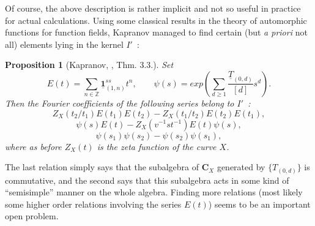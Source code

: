 \documentclass[a4paper,10pt]{amsart}
\def\Z{\mathbb{Z}}
\def\CC{\mathbf{C}}
\newtheorem{prop}[theo]{Proposition}
\numberwithin{equation}{section}
\begin{document}
{\vspace{.15in}

Of course, the above description is rather implicit and not so useful in practice for actual calculations. Using some classical results in the theory of automorphic functions for function fields, Kapranov managed to find certain (but \textit{a priori} not all) elements lying in the kernel $I'$~:

\vspace{.1in}

\begin{prop}[Kapranov, \cite{Kap1}, Thm. 3.3.] Set
$$E(t)=\sum_{n \in \Z} \underline{\mathbf{1}}^{ss}_{(1,n)}t^n, \qquad \psi(s)=exp\left(\sum_{d \geq 1}
\frac{\underline{T}_{(0,d)}}{[d]} s^d\right).$$
Then the Fourier coefficients of the following series belong to $I'$~:
$$Z_X(t_2/t_1){E}(t_1){E}(t_2)-Z_{X}(t_1/t_2){E}(t_2){E}(t_1),$$
$$\psi(s)E(t)-Z_X(v^{-1}st^{-1}){E}(t)\psi(s),$$
$$\psi(s_1)\psi(s_2)-\psi(s_2)\psi(s_1),$$
where as before $Z_X(t)$ is the zeta function of the curve $X$.
\end{prop}

\vspace{.1in}

The last relation simply says that the subalgebra of $\CC_X$ generated by $\{T_{(0,d)}\}$ is commutative, and the second says that this subalgebra acts in some kind of ``semisimple'' manner on the whole algebra. Finding more relations (most likely some higher order relations involving the series
$E(t)$) seems to be an important open problem.

\vspace{.15in}

\addtocounter{theo}{1}
}
\end{document}

